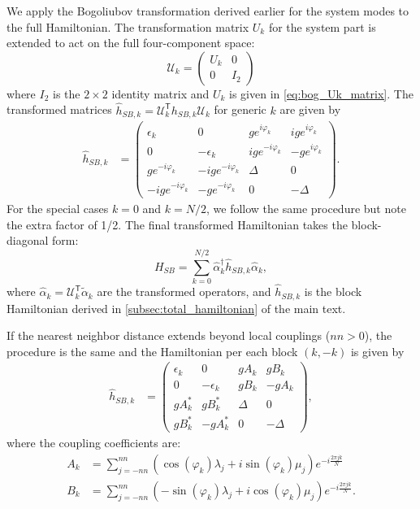 We apply the Bogoliubov transformation derived earlier for the system modes to the full Hamiltonian. The transformation matrix $U_k$ for the system part is extended to act on the full four-component space:
\begin{equation}
    \mathcal{U}_k =
    \begin{pmatrix}
        U_k &0\\
        0   &I_2
    \end{pmatrix}
\end{equation}
where $I_2$ is the $2\times 2$ identity matrix and $U_k$ is given in \cref{eq:bog_Uk_matrix}.
The transformed matrices $\hat{h}_{SB,k} = \mathcal{U}_k^\mathsf{T} h_{SB,k} \mathcal{U}_k$ for generic $k$ are given by
\begin{align}
    \hat{h}_{SB,k} &=
    \begin{pmatrix}
        \epsilon_k          &0                   &g e^{i\varphi_k}   &ig e^{i\varphi_k}\\
        0                   &-\epsilon_k         &ig e^{-i\varphi_k} &-g e^{i\varphi_k}\\
        g e^{-i\varphi_k}   &-ig e^{-i\varphi_k} &\Delta             &0\\
        -ig e^{-i\varphi_k} &-g e^{-i\varphi_k}  &0                  &-\Delta
    \end{pmatrix}.
\end{align}
For the special cases $k=0$ and $k=N/2$, we follow the same procedure but note the extra factor of 1/2. The final transformed Hamiltonian takes the block-diagonal form:
\begin{equation}
    H_{SB} = \sum_{k=0}^{N/2} \hat{\alpha}_k^\dagger \hat{h}_{SB,k} \hat{\alpha}_k,
\end{equation}
where $\hat{\alpha}_k = \mathcal{U}_k^\mathsf{T} \tilde{\alpha}_k$ are the transformed operators, and $\hat{h}_{SB,k}$ is the block Hamiltonian derived in \cref{subsec:total_hamiltonian} of the main text.

If the nearest neighbor distance extends beyond local couplings ($nn>0$), the procedure is the same and the Hamiltonian per each block $(k,-k)$ is given by
\begin{align}
    \hat{h}_{SB,k} &=
    \begin{pmatrix}
        \epsilon_k &0           &gA_k   &gB_k\\
        0          &-\epsilon_k &gB_k   &-g A_k\\
        g A_k^*    &g B_k^*     &\Delta &0\\
        gB_k^*     &-g A_k^*    &0      &-\Delta
    \end{pmatrix},\label{eq:hsb_momentum_space_nn>0}
\end{align}
where the coupling coefficients are:
\begin{align}
    A_k &=\sum_{j=-nn}^{nn}\left(\cos(\varphi_k)\lambda_j+i\sin(\varphi_k)\mu_j\right)e^{-i\frac{2\pi jk}{N}}
    \label{eq:Ak in hsb_k}\\
    B_k &=\sum_{j=-nn}^{nn}\left(-\sin(\varphi_k)\lambda_j+i\cos(\varphi_k)\mu_j\right)e^{-i\frac{2\pi jk}{N}}.
    \label{eq:Bk in hsb_k}
\end{align}

